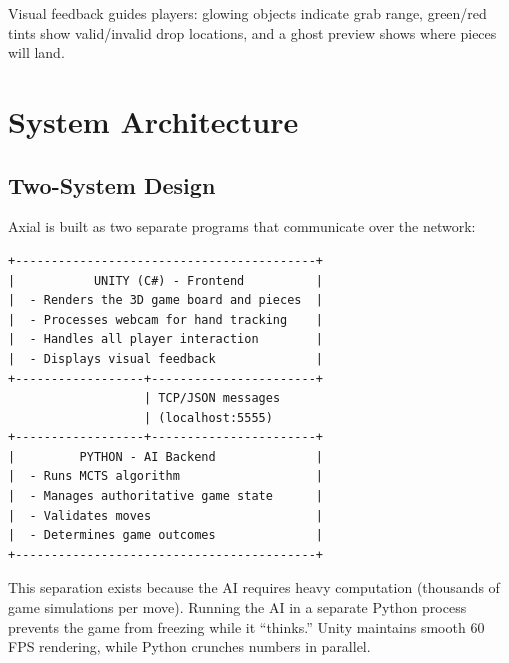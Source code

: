 \documentclass[11pt]{article}
\begin{document}
Visual feedback guides players: glowing objects indicate grab range, green/red tints show valid/invalid drop locations, and a ghost preview shows where pieces will land.


\section{System Architecture}

\subsection{Two-System Design}

Axial is built as two separate programs that communicate over the network:

\noindent\begin{minipage}{\linewidth}
\begin{verbatim}
+------------------------------------------+
|           UNITY (C#) - Frontend          |
|  - Renders the 3D game board and pieces  |
|  - Processes webcam for hand tracking    |
|  - Handles all player interaction        |
|  - Displays visual feedback              |
+------------------+-----------------------+
                   | TCP/JSON messages
                   | (localhost:5555)
+------------------+-----------------------+
|         PYTHON - AI Backend              |
|  - Runs MCTS algorithm                   |
|  - Manages authoritative game state      |
|  - Validates moves                       |
|  - Determines game outcomes              |
+------------------------------------------+
\end{verbatim}
\end{minipage}

This separation exists because the AI requires heavy computation (thousands of game simulations per move). Running the AI in a separate Python process prevents the game from freezing while it ``thinks.'' Unity maintains smooth 60 FPS rendering, while Python crunches numbers in parallel.

\end{document}
